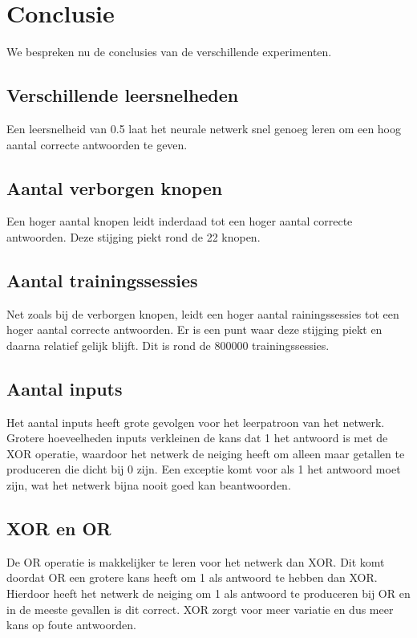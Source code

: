 \documentclass[10pt]{article}
\begin{document}
\section{Conclusie}
We bespreken nu de conclusies van de verschillende experimenten.

\subsection{Verschillende leersnelheden}
Een leersnelheid van 0.5 laat het neurale netwerk snel genoeg leren om een hoog aantal correcte antwoorden te geven. 

\subsection{Aantal verborgen knopen}
Een hoger aantal knopen leidt inderdaad tot een hoger aantal correcte antwoorden. Deze stijging piekt rond de 22 knopen.

\subsection{Aantal trainingssessies}
Net zoals bij de verborgen knopen, leidt een hoger aantal rainingssessies tot een hoger aantal correcte antwoorden. Er is een punt waar deze stijging piekt en daarna relatief gelijk blijft. Dit is rond de 800000 trainingssessies.

\subsection{Aantal inputs}
Het aantal inputs heeft grote gevolgen voor het leerpatroon van het netwerk. Grotere hoeveelheden inputs verkleinen de kans dat 1 het antwoord is met de XOR operatie, waardoor het netwerk de neiging heeft om alleen maar getallen te produceren die dicht bij 0 zijn. Een exceptie komt voor als 1 het antwoord moet zijn, wat het netwerk bijna nooit goed kan beantwoorden.

\subsection{XOR en OR}
De OR operatie is makkelijker te leren voor het netwerk dan XOR. Dit komt doordat OR een grotere kans heeft om 1 als antwoord te hebben dan XOR. Hierdoor heeft het netwerk de neiging om 1 als antwoord te produceren bij OR en in de meeste gevallen is dit correct. XOR zorgt voor meer variatie en dus meer kans op foute antwoorden.
\end{document}
